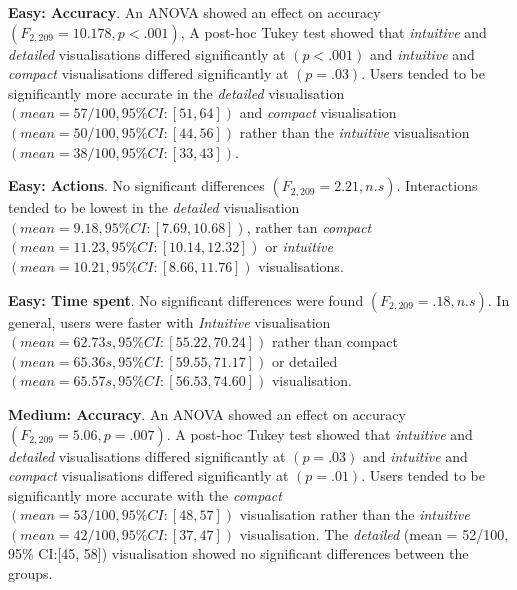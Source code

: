 \documentclass[final,5p,times,twocolumn,authoryear]{elsarticle}
\begin{document}






\textbf{Easy: Accuracy}. An ANOVA showed an effect on accuracy $(F_{2, 209}=10.178, p < .001)$, A post-hoc Tukey test showed that \emph{intuitive} and \emph{detailed} visualisations differed significantly at $(p < .001)$ and \emph{intuitive} and \emph{compact} visualisations differed significantly at $(p = .03)$. Users tended to be significantly more accurate in the \emph{detailed} visualisation $(mean = 57/100, 95\% CI: [51, 64])$ and \emph{compact} visualisation  $(mean = 50/100, 95\% CI: [44, 56])$ rather than the \emph{intuitive} visualisation $(mean = 38/100, 95\% CI: [33, 43])$. %

\textbf{Easy: Actions}. No significant differences $(F_{2, 209}= 2.21, n.s)$. Interactions tended to be lowest in the \emph{detailed} visualisation $(mean =  9.18, 95\% CI:[7.69, 10.68])$, rather tan \emph{compact} $(mean = 11.23, 95\% CI:[10.14, 12.32])$ or \emph{intuitive}  $(mean = 10.21, 95\% CI:[8.66, 11.76])$  visualisations.

\textbf{Easy: Time spent}. No significant differences were found $(F_{2, 209}= .18, n.s)$. In general, users were faster with \emph{Intuitive} visualisation $(mean = 62.73s, 95\% CI:[55.22, 70.24])$ rather than compact $(mean = 65.36s, 95\% CI:[59.55, 71.17])$ or detailed $(mean = 65.57s, 95\% CI:[56.53, 74.60])$ visualisation.


\textbf{Medium: Accuracy}. An ANOVA showed an effect on accuracy $(F_{2, 209}=5.06, p = .007)$. A post-hoc Tukey test showed that \emph{intuitive} and \emph{detailed} visualisations differed significantly at $(p = .03)$ and \emph{intuitive} and \emph{compact} visualisations differed significantly at $(p = .01)$. Users tended to be significantly more accurate with the \emph{compact} $(mean = 53/100, 95\% CI:[48, 57])$ visualisation rather than the \emph{intuitive} $(mean = 42/100, 95\% CI:[37, 47])$ visualisation. The \emph{detailed} (mean = 52/100, 95\% CI:[45, 58]) visualisation showed no significant differences between the groups.
 
\end{document}
